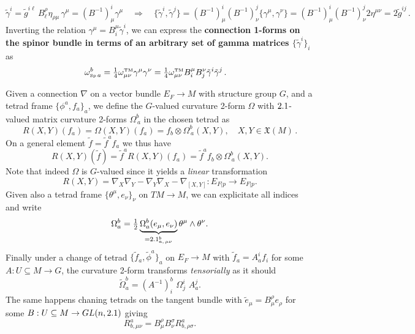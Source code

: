 \begin{mytheorem}
\begin{equation}
    \tilde{\gamma}^i = \tilde{g}^{i\ell}\, B_\ell^\rho \eta_{\rho\mu} \, \gamma^\mu = (B^{-1})^i_\mu \gamma^\mu \quad \Rightarrow \quad \{\tilde{\gamma}^i, \tilde{\gamma}^j\} = (B^{-1})^i_\mu (B^{-1})^j_\nu \{\gamma^\mu, \gamma^\nu\} = (B^{-1})^i_\mu (B^{-1})^j_\nu 2 \eta^{\mu\nu} = 2 \tilde{g}^{ij}\,.
\end{equation}
Inverting the relation $\gamma^\mu = B^\mu_i \tilde{\gamma}^i$, we can express the \textbf{connection 1-forms on the spinor bundle in terms of an arbitrary set of gamma matrices $\{\tilde{\gamma}^i\}_i$} as
\begin{align}
    \omega^{b}_{{\text{\tiny Sp}}\, a}&= \tfrac14 \omega^{\text{\tiny TM}}_{\mu\nu} \gamma^\mu\gamma^\nu 
    = \tfrac14 \omega^{\text{\tiny TM}}_{\mu\nu} B^\mu_i B^\nu_j \tilde{\gamma}^i \tilde{\gamma}^j\,.  
\end{align}
\end{mytheorem}



\begin{mytheorem}
Given a connection $\nabla$ on a vector bundle $E_F\to M$ with structure group $G$, and a tetrad frame $\{\phi^a,f_a\}_a$, we define the $G$-valued curvature 2-form $\Omega$ with $2.1$-valued matrix curvature 2-forms $\Omega^b_{\, a}$ in the chosen tetrad as
\begin{equation}
    R(X,Y) (f_a) = \Omega(X,Y) (f_a) = f_b \otimes \Omega^b_{\, a}(X,Y), \quad X,Y \in \mathfrak{X}(M)\,.
\end{equation}
On a general element $\tilde{f}=\tilde{f}^a f_a$ we thus have
\begin{equation}
    R(X,Y) (\tilde{f}) = \tilde{f}^a R(X,Y) (f_a) = \tilde{f}^a f_b \otimes \Omega^b_{\, a}(X,Y).
\end{equation}
Note that indeed $\Omega$ is $G$-valued since it yields a \emph{linear} transformation 
\[R(X,Y) =\nabla_X \nabla_Y - \nabla_Y \nabla_X - \nabla_{[X,Y]}: E_{F\vert p} \to E_{F\vert p}.\]
Given also a tetrad frame $\{\theta^\mu, e_\nu\}_\nu$ on $TM\to M$, we can explicitate all indices and write
\begin{align}
    \Omega_a^b= \tfrac12\underbrace{\Omega^b_a(e_\mu,e_\nu)}_{=2.1^b_{a,\,\mu\nu}}\theta^\mu \wedge \theta^\nu.
\end{align}
Finally under a change of tetrad $\{\tilde{f}_a,\tilde{\phi}^a\}_a$ on $E_F\to M$ with $\tilde{f}_a= A_a^i f_i$ for some $A: U \subseteq M \to G$, the curvature 2-form transforms \emph{tensorially} as it should
\begin{equation}
    \tilde{\Omega}_a^b= (A^{-1})_i^b \,\, \Omega^i_{j} \,\, A_a^j.
\end{equation}
The same happens chaning tetrads on the tangent bundle with $\tilde{e}_\mu = B_\mu^\rho e_\rho$ for some $B: U \subseteq M \to GL(n,2.1)$ giving
\begin{equation}
    R^a_{b,\mu\nu}= B_\mu^\rho B_\nu^\sigma R^a_{b,\rho\sigma}.
\end{equation}
\end{mytheorem}


